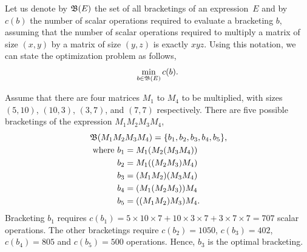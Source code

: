Let us denote by \(\mathfrak{B}(E)\) the set of all bracketings of an expression~\(E\) and by~\(c(b)\) the number of scalar operations required to evaluate a bracketing \(b\), assuming that the number of scalar operations required to multiply a matrix of size \((x, y)\) by a matrix of size \((y, z)\) is exactly \(xyz\).
Using this notation, we can state the optimization problem as follows, \[
    \min_{b \in \mathfrak{B}(E)}c(b).
\]

\begin{example}\label{ex:matrix-chain-intro}
    Assume that there are four matrices \(M_1\) to \(M_4\) to be multiplied, with sizes \((5, 10)\), \((10, 3)\), \((3, 7)\), and \((7, 7)\) respectively.
    There are five possible bracketings of the expression \(M_1M_2M_3M_4\),
    \begin{gather*}
        \brak(M_1M_2M_3M_4) = \{b_1, b_2, b_3, b_4, b_5\}\makebox[0pt][l]{,}\\
        \makebox[0pt][r]{where }b_1 = M_1(M_2(M_3M_4)) \\
        b_2 = M_1((M_2M_3)M_4) \\
        b_3 = (M_1M_2)(M_3M_4) \\
        b_4 = (M_1(M_2M_3))M_4 \\
        b_5 = ((M_1M_2)M_3)M_4\makebox[0pt][l]{.}
    \end{gather*}
    Bracketing \(b_1\) requires
    \(c(b_1) = 5\times10\times7 + 10\times3\times7 + 3\times7\times7 = 707\) scalar operations.
    The other bracketings require \(c(b_2) = 1050\), \(c(b_3) = 402\), \(c(b_4) = 805\) and \(c(b_5) = 500\) operations.
    Hence, \(b_3\) is the optimal bracketing.
\end{example}

